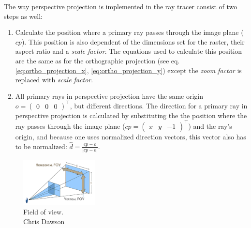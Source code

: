 \documentclass{article}
\begin{document}
\vspace*{\baselineskip}

The way perspective projection is implemented in the ray tracer consist of two steps as well: 

\begin{enumerate}[1.]

\item Calculate the position where a primary ray passes through the image plane ($cp$). This position is also dependent of the dimensions set for the raster, their aspect ratio and a \textit{scale factor}. The equations used to calculate this position are the same as for the orthographic projection (see eq. \ref{eq:ortho_projection_x}, \ref{eq:ortho_projection_y}) except the \textit{zoom factor} is replaced with \textit{scale factor}.

\item All primary rays in perspective projection have the same origin $o = \begin{pmatrix}0&0&0\end{pmatrix}^\top$, but different directions. The direction for a primary ray in perspective projection is calculated by substituting the the position where the ray passes through the image plane ($cp = \begin{pmatrix}x&y&-1\end{pmatrix}^\top$) and the ray's origin, and because one uses normalized direction vectors, this vector also has to be normalized: $\hat{d} = \frac{cp - o}{|cp - o|}$.

\end{enumerate}

\begin{figure}
    \centering
    \includegraphics[width=0.35\textwidth]{perspective_fov}
    \caption{Field of view. \\Chris Dawson}
    \label{fig:fov}
\end{figure}
\end{document}
